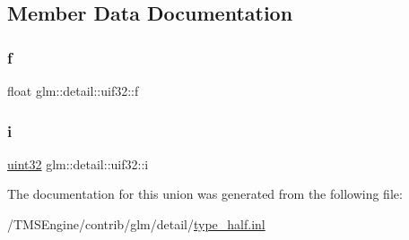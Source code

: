 \subsection{Member Data Documentation}
\mbox{\label{unionglm_1_1detail_1_1uif32_a5f697f84c5a8ec72c2f3a4f705f5bde8}} 
\subsubsection{\texorpdfstring{f}{f}}
{\footnotesize\ttfamily float glm\+::detail\+::uif32\+::f}

\mbox{\label{unionglm_1_1detail_1_1uif32_a981c1c59e160db23c73908cd7e629229}} 
\subsubsection{\texorpdfstring{i}{i}}
{\footnotesize\ttfamily \hyperlink{namespaceglm_1_1detail_ade6cfbf377022aaa391af8cd50489222}{uint32} glm\+::detail\+::uif32\+::i}



The documentation for this union was generated from the following file\+:\begin{DoxyCompactItemize}
\item 
/\+T\+M\+S\+Engine/contrib/glm/detail/\hyperlink{type__half_8inl}{type\+\_\+half.\+inl}\end{DoxyCompactItemize}
